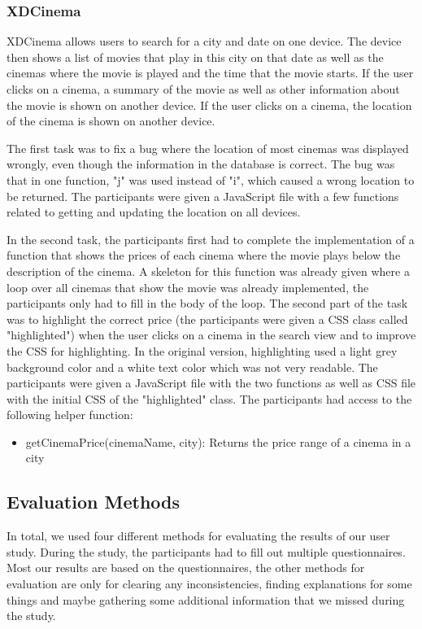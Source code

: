 \subsubsection{XDCinema}

XDCinema allows users to search for a city and date on one device. The device then shows a list of movies that play in this city on that date as well as the cinemas where the movie is played and the time that the movie starts. If the user clicks on a cinema, a summary of the movie as well as other information about the movie is shown on another device. If the user clicks on a cinema, the location of the cinema is shown on another device.

The first task was to fix a bug where the location of most cinemas was displayed wrongly, even though the information in the database is correct. The bug was that in one function, "j" was used instead of "i", which caused a wrong location to be returned. The participants were given a JavaScript file with a few functions related to getting and updating the location on all devices.

In the second task, the participants first had to complete the implementation of a function that shows the prices of each cinema where the movie plays below the description of the cinema. A skeleton for this function was already given where a loop over all cinemas that show the movie was already implemented, the participants only had to fill in the body of the loop. The second part of the task was to highlight the correct price (the participants were given a CSS class called "highlighted") when the user clicks on a cinema in the search view and to improve the CSS for highlighting. In the original version, highlighting used a light grey background color and a white text color which was not very readable. The participants were given a JavaScript file with the two functions as well as CSS file with the initial CSS of the "highlighted" class. The participants had access to the following helper function:
\begin{itemize}
	\item getCinemaPrice(cinemaName, city): Returns the price range of a cinema in a city
\end{itemize}

\subsection{Evaluation Methods}

In total, we used four different methods for evaluating the results of our user study. During the study, the participants had to fill out multiple questionnaires. Most our results are based on the questionnaires, the other methods for evaluation are only for clearing any inconsistencies, finding explanations for some things and maybe gathering some additional information that we missed during the study.

